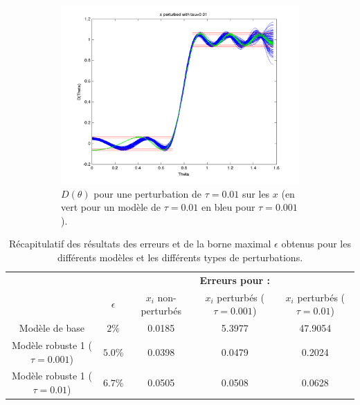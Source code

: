 \begin{figure}[h!]
\begin{subfigure}[b]{0.45\textwidth}
  \end{subfigure}
  \begin{subfigure}[b]{0.45\textwidth}
  \includegraphics[width=\textwidth]{D-ModRobust1-test3Rob01.png}
  \caption{$D(\theta)$ pour une perturbation de $\tau = 0.01$ sur les $x$ (en vert pour un modèle de $\tau=0.01$ en bleu pour $\tau=0.001$).}
  \label{fig:D-ModRobust1-test3RobTau01}
  \end{subfigure}
  \caption{}
  \end{figure}

\begin{table}
\centering
\begin{tabular}{c|c|ccc}
 & & & \textbf{Erreurs pour : } &\\
 & $\epsilon$ & $x_i$ non-perturbés & $x_i$ perturbés ($\tau=0.001$) & $x_i$ perturbés ($\tau=0.01$) \\
 \hline
Modèle de base & $2\%$ & 0.0185 & 5.3977 & 47.9054 \\
Modèle robuste 1 ($\tau=0.001$) & $5.0 \%$ & 0.0398 & 0.0479   & 0.2024 \\
Modèle robuste 1 ($\tau=0.01$)  & $6.7 \%$ & 0.0505 & 0.0508& 0.0628 \\
\end{tabular}
\caption{Récapitulatif des résultats des erreurs et de la borne maximal $\epsilon$ obtenus pour les différents modèles et les différents types de perturbations.}
\label{table:Recap}
\end{table}